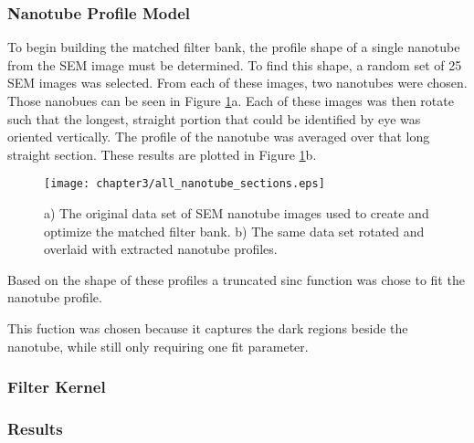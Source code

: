 \subsubsection{Nanotube Profile Model}

To begin building the matched filter bank, the profile shape of a single nanotube from the SEM image must be determined. To find this shape, a random set of 25 SEM images was selected. From each of these images, two nanotubes were chosen. Those nanobues can be seen in Figure \ref{fig:all_nanotube_sections}a. Each of these images was then rotate such that the longest, straight portion that could be identified by eye was oriented vertically. The profile of the nanotube was averaged over that long straight section. These results are plotted in Figure \ref{fig:all_nanotube_sections}b.

\begin{figure}
	\centering
	\texttt{[image: chapter3/all\_nanotube\_sections.eps]}
	\caption{a) The original data set of SEM nanotube images used to create and optimize the matched filter bank. b) The same data set rotated and overlaid with extracted nanotube profiles.}
	\label{fig:all_nanotube_sections}
\end{figure}


Based on the shape of these profiles a truncated sinc function was chose to fit the nanotube profile. 


This fuction was chosen because it captures the dark regions beside the nanotube, while still only requiring one fit parameter.

\subsubsection{Filter Kernel}

\subsubsection{Results}